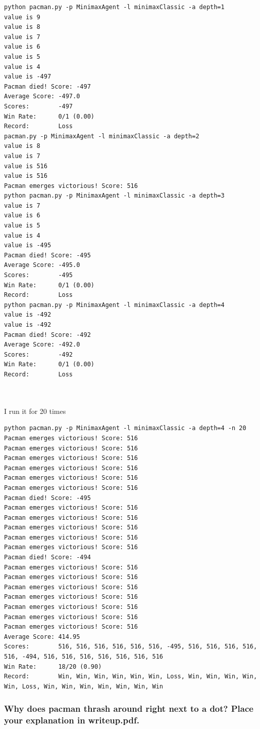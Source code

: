 \documentclass[12pt]{article}
\begin{document}
\begin{lstlisting}
python pacman.py -p MinimaxAgent -l minimaxClassic -a depth=1
value is 9
value is 8
value is 7
value is 6
value is 5
value is 4
value is -497
Pacman died! Score: -497
Average Score: -497.0
Scores:        -497
Win Rate:      0/1 (0.00)
Record:        Loss
pacman.py -p MinimaxAgent -l minimaxClassic -a depth=2
value is 8
value is 7
value is 516
value is 516
Pacman emerges victorious! Score: 516
python pacman.py -p MinimaxAgent -l minimaxClassic -a depth=3
value is 7
value is 6
value is 5
value is 4
value is -495
Pacman died! Score: -495
Average Score: -495.0
Scores:        -495
Win Rate:      0/1 (0.00)
Record:        Loss
python pacman.py -p MinimaxAgent -l minimaxClassic -a depth=4
value is -492
value is -492
Pacman died! Score: -492
Average Score: -492.0
Scores:        -492
Win Rate:      0/1 (0.00)
Record:        Loss



\end{lstlisting}
I run it for 20 times
\begin{lstlisting}
python pacman.py -p MinimaxAgent -l minimaxClassic -a depth=4 -n 20
Pacman emerges victorious! Score: 516
Pacman emerges victorious! Score: 516
Pacman emerges victorious! Score: 516
Pacman emerges victorious! Score: 516
Pacman emerges victorious! Score: 516
Pacman emerges victorious! Score: 516
Pacman died! Score: -495
Pacman emerges victorious! Score: 516
Pacman emerges victorious! Score: 516
Pacman emerges victorious! Score: 516
Pacman emerges victorious! Score: 516
Pacman emerges victorious! Score: 516
Pacman died! Score: -494
Pacman emerges victorious! Score: 516
Pacman emerges victorious! Score: 516
Pacman emerges victorious! Score: 516
Pacman emerges victorious! Score: 516
Pacman emerges victorious! Score: 516
Pacman emerges victorious! Score: 516
Pacman emerges victorious! Score: 516
Average Score: 414.95
Scores:        516, 516, 516, 516, 516, 516, -495, 516, 516, 516, 516, 516, -494, 516, 516, 516, 516, 516, 516, 516
Win Rate:      18/20 (0.90)
Record:        Win, Win, Win, Win, Win, Win, Loss, Win, Win, Win, Win, Win, Loss, Win, Win, Win, Win, Win, Win, Win
\end{lstlisting}



\subsubsection{Why does pacman thrash around right next to a dot? Place your explanation in writeup.pdf. }
\end{document}
